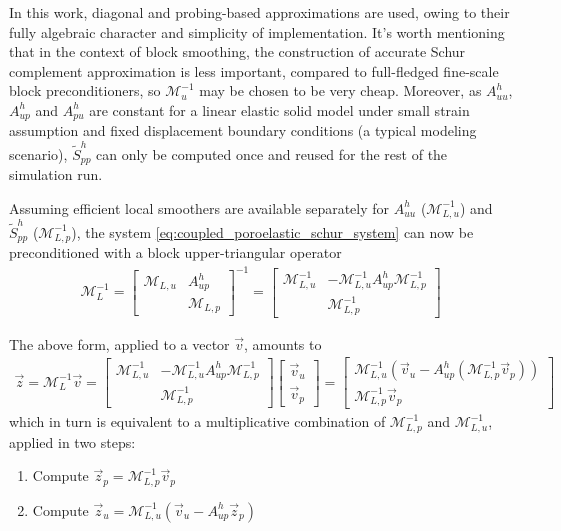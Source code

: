 In this work, diagonal and probing-based approximations are used, owing to their fully algebraic character and simplicity of implementation.   It's worth mentioning that in the context of block smoothing, the construction of accurate Schur complement approximation is less important, compared to full-fledged fine-scale block preconditioners, so $\mathcal{M}_u^{-1}$ may be chosen to be very cheap.   Moreover, as $A_{uu}^h$, $A_{up}^h$ and $A_{pu}^h$ are constant for a linear elastic solid model under small strain assumption and fixed displacement boundary conditions (a typical modeling scenario), $\tilde{S}_{pp}^h$ can only be computed once and reused for the rest of the simulation run.

Assuming efficient local smoothers are available separately for $A_{uu}^h$ ($\mathcal{M}_{L,u}^{-1}$) and $\tilde{S}_{pp}^h$ ($\mathcal{M}_{L,p}^{-1}$), the system \cref{eq:coupled_poroelastic_schur_system} can now be preconditioned with a block upper-triangular operator
\begin{align}
    \mathcal{M}_L^{-1} =
    \begin{bmatrix}
        \mathcal{M}_{L,u} & A_{up}^h          \\
                          & \mathcal{M}_{L,p}
    \end{bmatrix}^{-1}
    =
    \begin{bmatrix}
        \mathcal{M}_{L,u}^{-1} & -\mathcal{M}_{L,u}^{-1} A_{up}^h \mathcal{M}_{L,p}^{-1} \\
                               &  \mathcal{M}_{L,p}^{-1}
    \end{bmatrix}
\end{align}

The above form, applied to a vector $\vec{v}$, amounts to
\begin{align}
    \vec{z} = \mathcal{M}_L^{-1}\vec{v} = 
    \begin{bmatrix}
        \mathcal{M}_{L,u}^{-1} & -\mathcal{M}_{L,u}^{-1} A_{up}^h \mathcal{M}_{L,p}^{-1} \\
                               &  \mathcal{M}_{L,p}^{-1}
    \end{bmatrix}
    \begin{bmatrix}
        \vec{v}_u \\
        \vec{v}_p
    \end{bmatrix}
    =
    \begin{bmatrix}
        \mathcal{M}_{L,u}^{-1} \left(\vec{v}_u - A_{up}^h (\mathcal{M}_{L,p}^{-1} \vec{v}_p)\right) \\
        \mathcal{M}_{L,p}^{-1} \vec{v}_p
    \end{bmatrix}
\end{align}
which in turn is equivalent to a multiplicative combination of $\mathcal{M}_{L,p}^{-1}$ and $\mathcal{M}_{L,u}^{-1}$, applied in two steps:
\begin{enumerate}
    \item Compute $\vec{z}_p = \mathcal{M}_{L,p}^{-1} \vec{v}_p$
    \item Compute $\vec{z}_u = \mathcal{M}_{L,u}^{-1}(\vec{v}_u - A_{up}^h \vec{z}_p)$
\end{enumerate}

